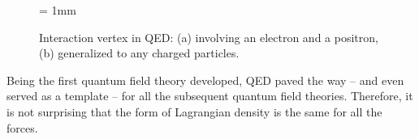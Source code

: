 \begin{figure}[H]
\begin{center}
\unitlength = 1mm
\end{center}
\caption{Interaction vertex in QED: (a) involving an electron and a positron, (b) generalized to any charged particles.}
\label{fig:FeynmanDiagramQED}
\end{figure}



Being the first quantum field theory developed, QED paved the way -- and even served as a template -- for all the subsequent quantum field theories. Therefore, it is not surprising that the form of Lagrangian density is the same for all the forces. 

